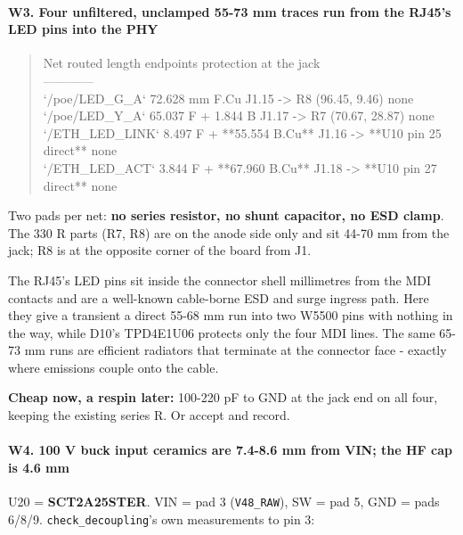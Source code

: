 \documentclass[11pt,a4paper]{article}
\begin{document}
\paragraph*{W3. Four unfiltered, unclamped 55-73 mm traces run from the RJ45's LED pins into the PHY}
\begin{quote}\small\ttfamily\raggedright
\textbar{} Net \textbar{} routed length \textbar{} endpoints \textbar{} protection at the jack \textbar{}\\
\textbar{}---\textbar{}---\textbar{}---\textbar{}---\textbar{}\\
\textbar{} `/poe/LED\_G\_A` \textbar{} 72.628 mm F.Cu \textbar{} J1.15 -\textgreater{} R8 (96.45, 9.46) \textbar{} none \textbar{}\\
\textbar{} `/poe/LED\_Y\_A` \textbar{} 65.037 F + 1.844 B \textbar{} J1.17 -\textgreater{} R7 (70.67, 28.87) \textbar{} none \textbar{}\\
\textbar{} `/ETH\_LED\_LINK` \textbar{} 8.497 F + {*}{*}55.554 B.Cu{*}{*} \textbar{} J1.16 -\textgreater{} {*}{*}U10 pin 25 direct{*}{*} \textbar{} none \textbar{}\\
\textbar{} `/ETH\_LED\_ACT` \textbar{} 3.844 F + {*}{*}67.960 B.Cu{*}{*} \textbar{} J1.18 -\textgreater{} {*}{*}U10 pin 27 direct{*}{*} \textbar{} none \textbar{}
\end{quote}
Two pads per net: \textbf{no series resistor, no shunt capacitor, no ESD clamp}. The 330 R parts (R7, R8) are on the anode side only and sit 44-70 mm from the jack; R8 is at the opposite corner of the board from J1.

The RJ45's LED pins sit inside the connector shell millimetres from the MDI contacts and are a well-known cable-borne ESD and surge ingress path. Here they give a transient a direct 55-68 mm run into two W5500 pins with nothing in the way, while D10's TPD4E1U06 protects only the four MDI lines. The same 65-73 mm runs are efficient radiators that terminate at the connector face - exactly where emissions couple onto the cable.

\textbf{Cheap now, a respin later:} 100-220 pF to GND at the jack end on all four, keeping the existing series R. Or accept and record.

\paragraph*{W4. 100 V buck input ceramics are 7.4-8.6 mm from VIN; the HF cap is 4.6 mm}
U20 = \textbf{SCT2A25STER}. VIN = pad 3 (\texttt{V48\_RAW}), SW = pad 5, GND = pads 6/8/9. \texttt{check\_decoupling}'s own measurements to pin 3:
\end{document}
